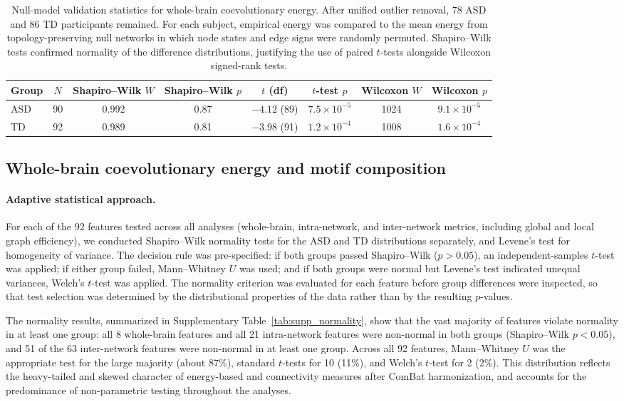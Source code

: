 \documentclass[10pt,letterpaper]{article}
\begin{document}
\begin{table}[ht]
\centering
\caption{Null-model validation statistics for whole-brain coevolutionary energy. After unified
outlier removal, 78 ASD and 86 TD participants remained. For each subject, empirical energy was
compared to the mean energy from topology-preserving null networks in which node states and edge
signs were randomly permuted. Shapiro--Wilk tests confirmed normality of the difference
distributions, justifying the use of paired $t$-tests alongside Wilcoxon signed-rank tests.}
\label{tab:null_model_validation}
\small
\begin{tabular}{lccccccc}
\toprule
Group & $N$ & Shapiro--Wilk $W$ & Shapiro--Wilk $p$ & $t$ (df) & $t$-test $p$ & Wilcoxon $W$ & Wilcoxon $p$ \\
\midrule
ASD & 90 & 0.992 & 0.87 & $-4.12$ (89) & $7.5\times 10^{-5}$ & 1024 & $9.1\times 10^{-5}$ \\
TD  & 92 & 0.989 & 0.81 & $-3.98$ (91) & $1.2\times 10^{-4}$ & 1008 & $1.6\times 10^{-4}$ \\
\bottomrule
\end{tabular}
\end{table}

\subsection*{Whole-brain coevolutionary energy and motif composition}

\paragraph*{Adaptive statistical approach.}
For each of the 92 features tested across all analyses (whole-brain, intra-network, and inter-network
metrics, including global and local graph efficiency), we conducted Shapiro--Wilk normality tests
for the ASD and TD distributions separately, and Levene's test for homogeneity of variance. The
decision rule was pre-specified: if both groups passed Shapiro--Wilk ($p > 0.05$), an
independent-samples $t$-test was applied; if either group failed, Mann--Whitney $U$ was used; and
if both groups were normal but Levene's test indicated unequal variances, Welch's $t$-test was
applied. The normality criterion was evaluated for each feature before group differences were
inspected, so that test selection was determined by the distributional properties of the data rather
than by the resulting $p$-values.

The normality results, summarized in Supplementary Table~\ref{tab:supp_normality}, show that the
vast majority of features violate normality in at least one group: all 8 whole-brain features and
all 21 intra-network features were non-normal in both groups (Shapiro--Wilk $p < 0.05$), and 51
of the 63 inter-network features were non-normal in at least one group. Across all 92 features,
Mann--Whitney $U$ was the appropriate test for the large majority (about 87\%), standard $t$-tests for 10 (11\%), and
Welch's $t$-test for 2 (2\%). This distribution reflects the heavy-tailed and skewed character of
energy-based and connectivity measures after ComBat harmonization, and accounts for the
predominance of non-parametric testing throughout the analyses.
\end{document}
